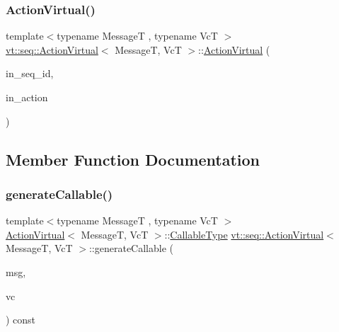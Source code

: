 \subsubsection{\texorpdfstring{Action\+Virtual()}{ActionVirtual()}}
{\footnotesize\ttfamily template$<$typename MessageT , typename VcT $>$ \\
\hyperlink{structvt_1_1seq_1_1_action_virtual}{vt\+::seq\+::\+Action\+Virtual}$<$ MessageT, VcT $>$\+::\hyperlink{structvt_1_1seq_1_1_action_virtual}{Action\+Virtual} (\begin{DoxyParamCaption}\item[{\hyperlink{namespacevt_1_1seq_a3b612da217ac669d39c159f134ab8434}{Seq\+Type} const \&}]{in\+\_\+seq\+\_\+id,  }\item[{\hyperlink{structvt_1_1seq_1_1_action_virtual_a878b5933c67038a3b6e27aaa218693aa}{Action\+Type} const \&}]{in\+\_\+action }\end{DoxyParamCaption})}



\subsection{Member Function Documentation}
\mbox{\label{structvt_1_1seq_1_1_action_virtual_a97c9c072c84663af96b333c8175f1e38}} 
\subsubsection{\texorpdfstring{generate\+Callable()}{generateCallable()}}
{\footnotesize\ttfamily template$<$typename MessageT , typename VcT $>$ \\
\hyperlink{structvt_1_1seq_1_1_action_virtual}{Action\+Virtual}$<$ MessageT, VcT $>$\+::\hyperlink{structvt_1_1seq_1_1_action_virtual_a34bde8c3ecdadca35bc183f5e0dcca1c}{Callable\+Type} \hyperlink{structvt_1_1seq_1_1_action_virtual}{vt\+::seq\+::\+Action\+Virtual}$<$ MessageT, VcT $>$\+::generate\+Callable (\begin{DoxyParamCaption}\item[{MessageT $\ast$}]{msg,  }\item[{VcT $\ast$}]{vc }\end{DoxyParamCaption}) const}

